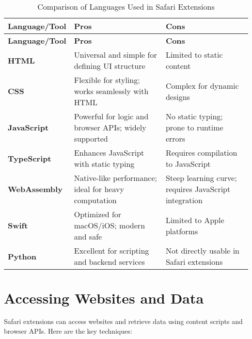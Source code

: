 \documentclass[a4paper,12pt]{article}
\begin{document}
\begin{longtable}{|p{3cm}|p{5cm}|p{5cm}|}
    \caption{Comparison of Languages Used in Safari Extensions}                                                                            \\
    \hline
    \textbf{Language/Tool} & \textbf{Pros}                                         & \textbf{Cons}                                         \\
    \hline
    \endfirsthead

    \hline
    \textbf{Language/Tool} & \textbf{Pros}                                         & \textbf{Cons}                                         \\
    \hline
    \endhead

    \hline
    \endfoot

    \hline
    \endlastfoot

    \textbf{HTML}          & Universal and simple for defining UI structure        & Limited to static content                             \\
    \hline
    \textbf{CSS}           & Flexible for styling; works seamlessly with HTML      & Complex for dynamic designs                           \\
    \hline
    \textbf{JavaScript}    & Powerful for logic and browser APIs; widely supported & No static typing; prone to runtime errors             \\
    \hline
    \textbf{TypeScript}    & Enhances JavaScript with static typing                & Requires compilation to JavaScript                    \\
    \hline
    \textbf{WebAssembly}   & Native-like performance; ideal for heavy computation  & Steep learning curve; requires JavaScript integration \\
    \hline
    \textbf{Swift}         & Optimized for macOS/iOS; modern and safe              & Limited to Apple platforms                            \\
    \hline
    \textbf{Python}        & Excellent for scripting and backend services          & Not directly usable in Safari extensions              \\
\end{longtable}

\section{Accessing Websites and Data}
Safari extensions can access websites and retrieve data using content scripts and browser APIs. Here are the key techniques:
\end{document}
